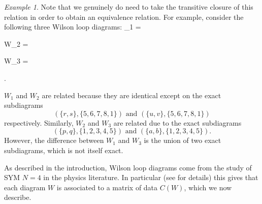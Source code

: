 \documentclass[11pt]{article}
\newcommand{\drawWLD}[2]{

\pgfmathsetmacro{\n}{#1}
\pgfmathsetmacro{\radius}{#2}
\pgfmathsetmacro{\angle}{360/\n}
\draw (0,0) circle (\radius);
    \foreach \i in {1,2,...,\n} {
      \draw (\angle*\i:\radius) node {$\bullet$};
    }

}
\newcommand{\drawlabeledprop}[5]{
\pgfmathsetmacro{\r}{#1}
\pgfmathsetmacro{\bumpr}{#2}
\pgfmathsetmacro{\s}{#3}
\pgfmathsetmacro{\bumps}{#4}
\pgfmathsetmacro{\perturbe}{\angle/\n}

\begin{scope}
\draw[propagator] (\angle*\r + \angle/2 + \bumpr*\perturbe:\radius) -- (\angle*\s + \angle/2 + \bumps*\perturbe:\radius) node[midway, below] {#5};
\end{scope}
}
\newcommand{\drawnumbers}{
  \foreach \i in {1,2,...,\n} {
  \pgfmathsetmacro{\x}{\angle*\i}
  \draw (\x:\radius*1.15) node {\footnotesize \i};
}
}
\def\bas #1\eas{\begin{align*} #1 \end{align*}}
\theoremstyle{remark}
\newtheorem{eg}[thm]{Example}
\theoremstyle{definition}
\begin{document}
\begin{eg} \label{eg:equivdiags}
Note that we genuinely do need to take the transitive closure of this relation in order to obtain an equivalence relation. For example, consider the following three Wilson loop diagrams: 
\bas
W_1 =  \quad
W_2 =  \quad
W_3 =  .
\eas


$W_1$ and $W_2$ are related because they are identical except on the exact subdiagrams 
\[(\{r, s\}, \{5,6,7,8,1\}) \text{ and }(\{u, v\}, \{5,6,7,8,1\})\] respectively. Similarly, $W_2$ and $W_3$ are related due to the exact subdiagrams 
\[(\{p, q\}, \{1,2,3,4,5\}) \text{ and }(\{a, b\}, \{1,2,3,4,5\}).\] 
However, the difference between $W_1$ and $W_3$ is the union of two exact subdiagrams, which is not itself exact.

\end{eg}
\medskip

As described in the introduction, Wilson loop diagrams come from the study of SYM $N = 4$ in the physics literature. In particular (see \cite{Adamo:2012xe} for details) this gives that each diagram $W$ is associated to a matrix of data $C(W)$, which we now describe. 
\end{document}
